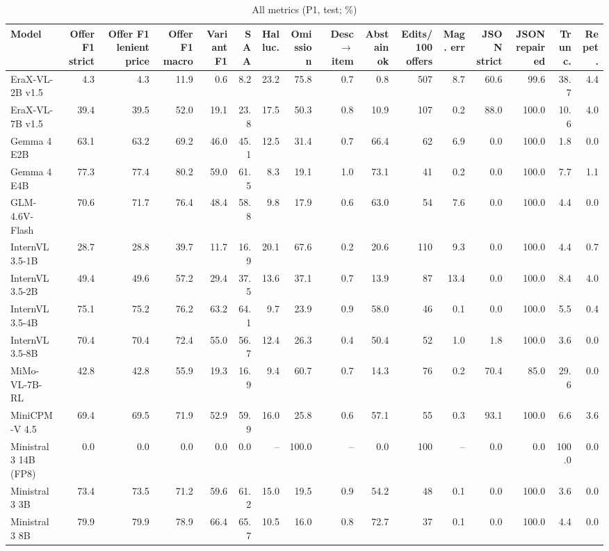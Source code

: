 \begin{table}[t]
\centering
\caption{All metrics (P1, test; \%)}
\label{tab:allmetrics}
\small
\begin{tabular}{lrrrrrrrrrrrrrrr}
\toprule
Model & Offer F1 strict & Offer F1 lenient price & Offer F1 macro & Variant F1 & SAA & Halluc. & Omission & Desc$\rightarrow$item & Abstain ok & Edits/100 offers & Mag. err & JSON strict & JSON repaired & Trunc. & Repet. \\
\midrule
EraX-VL-2B v1.5 & 4.3 & 4.3 & 11.9 & 0.6 & 8.2 & 23.2 & 75.8 & 0.7 & 0.8 & 507 & 8.7 & 60.6 & 99.6 & 38.7 & 4.4 \\
EraX-VL-7B v1.5 & 39.4 & 39.5 & 52.0 & 19.1 & 23.8 & 17.5 & 50.3 & 0.8 & 10.9 & 107 & 0.2 & 88.0 & 100.0 & 10.6 & 4.0 \\
Gemma 4 E2B & 63.1 & 63.2 & 69.2 & 46.0 & 45.1 & 12.5 & 31.4 & 0.7 & 66.4 & 62 & 6.9 & 0.0 & 100.0 & 1.8 & 0.0 \\
Gemma 4 E4B & 77.3 & 77.4 & 80.2 & 59.0 & 61.5 & 8.3 & 19.1 & 1.0 & 73.1 & 41 & 0.2 & 0.0 & 100.0 & 7.7 & 1.1 \\
GLM-4.6V-Flash & 70.6 & 71.7 & 76.4 & 48.4 & 58.8 & 9.8 & 17.9 & 0.6 & 63.0 & 54 & 7.6 & 0.0 & 100.0 & 4.4 & 0.0 \\
InternVL3.5-1B & 28.7 & 28.8 & 39.7 & 11.7 & 16.9 & 20.1 & 67.6 & 0.2 & 20.6 & 110 & 9.3 & 0.0 & 100.0 & 4.4 & 0.7 \\
InternVL3.5-2B & 49.4 & 49.6 & 57.2 & 29.4 & 37.5 & 13.6 & 37.1 & 0.7 & 13.9 & 87 & 13.4 & 0.0 & 100.0 & 8.4 & 4.0 \\
InternVL3.5-4B & 75.1 & 75.2 & 76.2 & 63.2 & 64.1 & 9.7 & 23.9 & 0.9 & 58.0 & 46 & 0.1 & 0.0 & 100.0 & 5.5 & 0.4 \\
InternVL3.5-8B & 70.4 & 70.4 & 72.4 & 55.0 & 56.7 & 12.4 & 26.3 & 0.4 & 50.4 & 52 & 1.0 & 1.8 & 100.0 & 3.6 & 0.0 \\
MiMo-VL-7B-RL & 42.8 & 42.8 & 55.9 & 19.3 & 16.9 & 9.4 & 60.7 & 0.7 & 14.3 & 76 & 0.2 & 70.4 & 85.0 & 29.6 & 0.0 \\
MiniCPM-V 4.5 & 69.4 & 69.5 & 71.9 & 52.9 & 59.9 & 16.0 & 25.8 & 0.6 & 57.1 & 55 & 0.3 & 93.1 & 100.0 & 6.6 & 3.6 \\
Ministral 3 14B (FP8) & 0.0 & 0.0 & 0.0 & 0.0 & 0.0 & – & 100.0 & – & 0.0 & 100 & – & 0.0 & 0.0 & 100.0 & 0.0 \\
Ministral 3 3B & 73.4 & 73.5 & 71.2 & 59.6 & 61.2 & 15.0 & 19.5 & 0.9 & 54.2 & 48 & 0.1 & 0.0 & 100.0 & 3.6 & 0.0 \\
Ministral 3 8B & 79.9 & 79.9 & 78.9 & 66.4 & 65.7 & 10.5 & 16.0 & 0.8 & 72.7 & 37 & 0.1 & 0.0 & 100.0 & 4.4 & 0.0 \\

\end{tabular}
\end{table}
